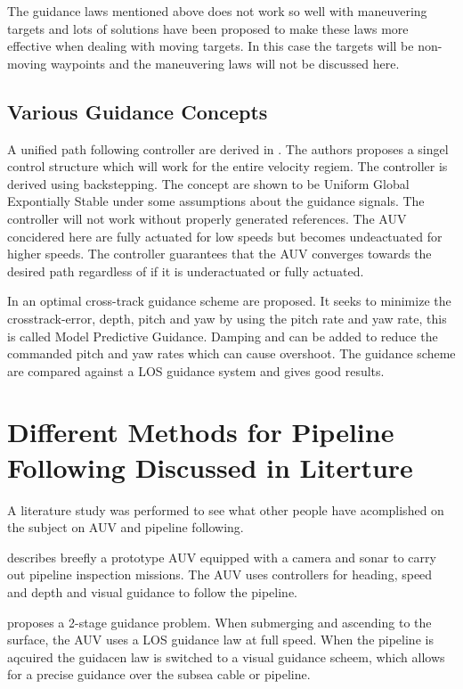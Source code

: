         	The guidance laws mentioned above does not work so well with maneuvering targets and lots of
		solutions have been proposed to make these laws more effective when dealing with moving
		targets. In this case the targets will be non-moving waypoints and the maneuvering laws
		will not be discussed here.
	
	
	\subsection{Various Guidance Concepts}
		A unified path following controller are derived in \cite{control-concept-AUV}. The 
		authors proposes a singel control structure which will work for the entire velocity regiem.
		The controller is derived using backstepping. The concept are shown to be Uniform Global
		Expontially Stable under some assumptions about the guidance signals. The controller will not
		work without properly generated references. The AUV concidered here are fully actuated for low
		speeds but becomes undeactuated for higher speeds. The controller guarantees that the AUV
		converges towards the desired path regardless of if it is underactuated or fully actuated.
		
		In \cite{optimal-cross-track} an optimal cross-track guidance scheme are proposed. It seeks to minimize
		the crosstrack-error, depth, pitch and yaw by using the pitch rate and yaw rate, this is called Model
		Predictive Guidance. Damping and can be added to reduce the commanded pitch and yaw rates which can
		cause overshoot. The guidance scheme are compared against a LOS guidance system and gives good
		results.

	
\section{Different Methods for Pipeline Following Discussed in Literture}
	A literature study was performed to see what other people have acomplished on the subject on AUV and 
	pipeline following. 

	\cite{piscis} describes breefly a prototype AUV equipped with a camera and sonar to carry out pipeline
	inspection missions. The AUV uses controllers for heading, speed and depth and visual guidance to
	follow the pipeline. 
	
	\cite{GuidanceReview} proposes a 2-stage guidance problem. When submerging and ascending to the surface, 
	the AUV uses a LOS guidance law at full speed. When the pipeline is aqcuired the guidacen law is switched 
	to a visual guidance scheem, which allows for a precise guidance over the subsea cable or pipeline. 
		
